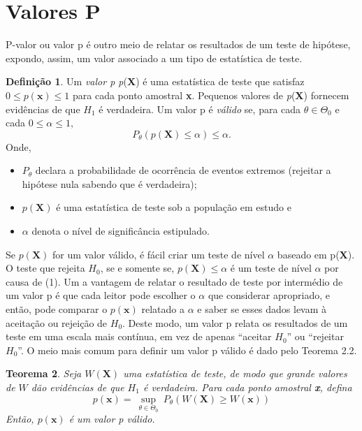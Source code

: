 \documentclass[10pt]{article}
\theoremstyle{plain}
\newtheorem{teor}{Teorema}[section]
\theoremstyle{remark}
\theoremstyle{definition}
\newtheorem{definition}[teor]{Definição}
\begin{document}
\section{Valores P}
P-valor ou valor p é outro meio de relatar os resultados de um teste de hipótese, expondo, assim, um valor associado a um tipo de estatística de teste.
\begin{definition}
Um \textit{valor p p}(\textbf{X}) é uma estatística de teste que satisfaz $0 \leq p(\textbf{x}) \leq 1$ para cada ponto amostral \textbf{x}. Pequenos valores de \textit{p}(\textbf{X}) fornecem evidências de que $H_{1}$ é verdadeira. Um valor p é \textit{válido} se, para cada $\theta \in \Theta_{0}$ e cada $0 \leq \alpha \leq 1$,
\begin{equation}
     P_{ \theta } (p(\textbf{X})  \leq  \alpha ) \leq  \alpha.
\end{equation}
Onde,
\begin{itemize}
    \item $P_{ \theta }$ declara a probabilidade de ocorrência de eventos extremos (rejeitar a hipótese nula sabendo que é verdadeira);
    \item $p(\textbf{X})$ é uma estatística de teste sob a população em estudo e
    \item $\alpha$ denota o nível de significância estipulado.
\end{itemize}
Se $p(\textbf{X})$ for um valor válido, é fácil criar um teste de nível $\alpha$ baseado em p(\textbf{X}). O teste que rejeita $H_{0}$, se e somente se, $p(\textbf{X}) \leq \alpha$ é um teste de nível $\alpha$ por causa de (1). Um a vantagem de relatar o resultado de teste por intermédio de um valor p é que cada leitor pode escolher o $\alpha$ que considerar apropriado, e então, pode comparar o $p(\textbf{x})$ relatado a $\alpha$ e saber se esses dados levam à aceitação ou rejeição de $H_0$. Deste modo, um valor p relata os resultados de um teste em uma escala mais contínua, em vez de apenas ``aceitar $H_0$'' ou ``rejeitar $H_0$''.
O meio mais comum para definir um valor p válido é dado pelo Teorema 2.2.
\end{definition}
\begin{teor}
Seja $W(\textbf{X})$ uma estatística de teste, de modo que grande valores de $W$ dão evidências de que $H_1$ é verdadeira. Para cada ponto amostral \textbf{x}, defina
\begin{equation}
    p(\textbf{x}) = \ \sup_{\theta \in \Theta_{0}} \ P_{\theta}(W(\textbf{X}) \geq W(\textbf{x}))
\end{equation}
Então, $p(\textbf{x})$ é um valor p válido.
\end{teor}
\end{document}
